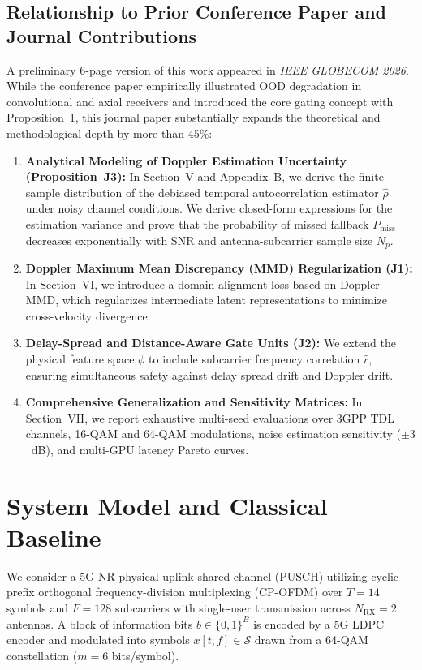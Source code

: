 \documentclass[journal,10pt,twocolumn]{IEEEtran}
\theoremstyle{definition}
\begin{document}
\subsection{Relationship to Prior Conference Paper and Journal Contributions}
A preliminary 6-page version of this work appeared in \textit{IEEE GLOBECOM 2026}. While the conference paper empirically illustrated OOD degradation in convolutional and axial receivers and introduced the core gating concept with Proposition~1, this journal paper substantially expands the theoretical and methodological depth by more than 45\%:
\begin{enumerate}
    \item \textbf{Analytical Modeling of Doppler Estimation Uncertainty (Proposition~J3):} In Section~V and Appendix~B, we derive the finite-sample distribution of the debiased temporal autocorrelation estimator $\hat{\rho}$ under noisy channel conditions. We derive closed-form expressions for the estimation variance and prove that the probability of missed fallback $P_{\mathrm{miss}}$ decreases exponentially with SNR and antenna-subcarrier sample size $N_p$.
    \item \textbf{Doppler Maximum Mean Discrepancy (MMD) Regularization (J1):} In Section~VI, we introduce a domain alignment loss based on Doppler MMD, which regularizes intermediate latent representations to minimize cross-velocity divergence.
    \item \textbf{Delay-Spread and Distance-Aware Gate Units (J2):} We extend the physical feature space $\phi$ to include subcarrier frequency correlation $\hat{r}$, ensuring simultaneous safety against delay spread drift and Doppler drift.
    \item \textbf{Comprehensive Generalization and Sensitivity Matrices:} In Section~VII, we report exhaustive multi-seed evaluations over 3GPP TDL channels, 16-QAM and 64-QAM modulations, noise estimation sensitivity ($\pm 3$~dB), and multi-GPU latency Pareto curves.
\end{enumerate}

\section{System Model and Classical Baseline}
We consider a 5G NR physical uplink shared channel (PUSCH) utilizing cyclic-prefix orthogonal frequency-division multiplexing (CP-OFDM) over $T = 14$ symbols and $F = 128$ subcarriers with single-user transmission across $N_{\mathrm{RX}} = 2$ antennas. A block of information bits $b \in \{0, 1\}^B$ is encoded by a 5G LDPC encoder and modulated into symbols $x[t, f] \in \mathcal{S}$ drawn from a 64-QAM constellation ($m = 6$ bits/symbol).
\end{document}
